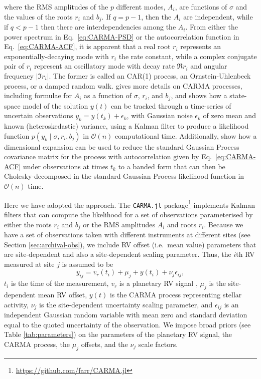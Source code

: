 \documentclass[modern]{aastex61}
\begin{document}
where the RMS amplitudes of the $p$ different modes, $A_i$, are
functions of $\sigma$ and the values of the roots $r_i$ and $b_j$.  If
$q = p-1$, then the $A_i$ are independent, while if $q < p-1$ then
there are interdependencies among the $A_i$.  From either the power
spectrum in Eq.\ \eqref{eq:CARMA-PSD} or the autocorrelation function
in Eq.\ \eqref{eq:CARMA-ACF}, it is apparent that a real root $r_i$
represents an exponentially-decaying mode with $r_i$ the rate
constant, while a complex conjugate pair of $r_i$ represent an
oscillatory mode with decay rate $\Re r_i$ and angular frequency
$\left|\Im r_i\right|$.  The former is called an CAR(1) process, an
Ornstein-Uhlenbeck process, or a damped random walk.
\citet{Kelly2014} gives more details on CARMA processes, including
formulae for $A_i$ as a function of $\sigma$, $r_i$, and $b_j$, and
shows how a state-space model of the solution $y(t)$ can be tracked
through a time-series of uncertain observations
$y_k = y\left( t_k \right) + \epsilon_k$, with Gaussian noise
$\epsilon_k$ of zero mean and known (heteroskedastic) variance, using
a Kalman filter to produce a likelihood function
$p\left( y_k \mid \sigma, r_i, b_j \right)$ in
$\mathcal{O}\left( n \right)$ computational time.  Additionally,
\citet{Foreman-Mackey2017} show how a dimensional expansion can be
used to reduce the standard Gaussian Process covariance matrix for the
process with autocorrelation given by Eq.\ \eqref{eq:CARMA-ACF} under
observations at times $t_k$ to a banded form that can then be
Cholesky-decomposed in the standard Gaussian Process likelihood
function in $\mathcal{O}\left( n \right)$ time.

Here we have adopted the \citet{Kelly2014} approach.  The \texttt{CARMA.jl} package\footnote{\url{https://github.com/farr/CARMA.jl}} implements Kalman filters that can compute the likelihood for a set of observations parameterised by either the roots $r_i$ and $b_j$ or the RMS amplitudes $A_i$ and roots $r_i$.  Because we have a set of observations taken with different instruments at different sites (see Section \ref{sec:archival-obs}), we include RV offset (i.e.\ mean value) parameters that are site-dependent and also a site-dependent scaling parameter.  Thus, the $i$th RV measured at site $j$ is assumed to be
\begin{equation}
\label{eq:RV-model}
y_{ij} = v_r\left(t_i\right) + \mu_j + y\left( t_i \right) + \nu_j \epsilon_{ij},
\end{equation}
$t_i$ is the time of the measurement, $v_r$ is a planetary RV signal \citep{Hatzes2015}, $\mu_j$ is the site-dependent mean RV offset, $y(t)$ is the CARMA process representing stellar activity, $\nu_j$ is the site-dependent uncertainty scaling parameter, and $\epsilon_{ij}$ is an independent Gaussian random variable with mean zero and standard deviation equal to the quoted uncertainty of the observation.  We impose broad priors (see Table \ref{tab:parameters}) on the parameters of the planetary RV signal, the CARMA process, the $\mu_j$ offsets, and the $\nu_j$ scale factors.
\end{document}
